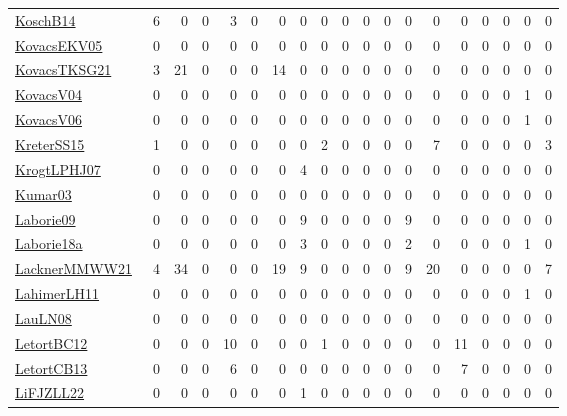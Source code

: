 {\begin{longtable}{l*{18}{r}}
\href{papers/KoschB14.pdf}{KoschB14}~\cite{KoschB14} & 6 & 0 & 0 & 3 & 0 & 0 & 0 & 0 & 0 & 0 & 0 & 0 & 0 & 0 & 0 & 0 & 0 & 0\\
\href{papers/KovacsEKV05.pdf}{KovacsEKV05}~\cite{KovacsEKV05} & 0 & 0 & 0 & 0 & 0 & 0 & 0 & 0 & 0 & 0 & 0 & 0 & 0 & 0 & 0 & 0 & 0 & 0\\
\href{papers/KovacsTKSG21.pdf}{KovacsTKSG21}~\cite{KovacsTKSG21} & 3 & 21 & 0 & 0 & 0 & 14 & 0 & 0 & 0 & 0 & 0 & 0 & 0 & 0 & 0 & 0 & 0 & 0\\
\href{papers/KovacsV04.pdf}{KovacsV04}~\cite{KovacsV04} & 0 & 0 & 0 & 0 & 0 & 0 & 0 & 0 & 0 & 0 & 0 & 0 & 0 & 0 & 0 & 0 & 1 & 0\\
\href{papers/KovacsV06.pdf}{KovacsV06}~\cite{KovacsV06} & 0 & 0 & 0 & 0 & 0 & 0 & 0 & 0 & 0 & 0 & 0 & 0 & 0 & 0 & 0 & 0 & 1 & 0\\
\href{papers/KreterSS15.pdf}{KreterSS15}~\cite{KreterSS15} & 1 & 0 & 0 & 0 & 0 & 0 & 0 & 2 & 0 & 0 & 0 & 0 & 7 & 0 & 0 & 0 & 0 & 3\\
\href{papers/KrogtLPHJ07.pdf}{KrogtLPHJ07}~\cite{KrogtLPHJ07} & 0 & 0 & 0 & 0 & 0 & 0 & 4 & 0 & 0 & 0 & 0 & 0 & 0 & 0 & 0 & 0 & 0 & 0\\
\href{papers/Kumar03.pdf}{Kumar03}~\cite{Kumar03} & 0 & 0 & 0 & 0 & 0 & 0 & 0 & 0 & 0 & 0 & 0 & 0 & 0 & 0 & 0 & 0 & 0 & 0\\
\href{papers/Laborie09.pdf}{Laborie09}~\cite{Laborie09} & 0 & 0 & 0 & 0 & 0 & 0 & 9 & 0 & 0 & 0 & 0 & 9 & 0 & 0 & 0 & 0 & 0 & 0\\
\href{papers/Laborie18a.pdf}{Laborie18a}~\cite{Laborie18a} & 0 & 0 & 0 & 0 & 0 & 0 & 3 & 0 & 0 & 0 & 0 & 2 & 0 & 0 & 0 & 0 & 1 & 0\\
\href{papers/LacknerMMWW21.pdf}{LacknerMMWW21}~\cite{LacknerMMWW21} & 4 & 34 & 0 & 0 & 0 & 19 & 9 & 0 & 0 & 0 & 0 & 9 & 20 & 0 & 0 & 0 & 0 & 7\\
\href{papers/LahimerLH11.pdf}{LahimerLH11}~\cite{LahimerLH11} & 0 & 0 & 0 & 0 & 0 & 0 & 0 & 0 & 0 & 0 & 0 & 0 & 0 & 0 & 0 & 0 & 1 & 0\\
\href{papers/LauLN08.pdf}{LauLN08}~\cite{LauLN08} & 0 & 0 & 0 & 0 & 0 & 0 & 0 & 0 & 0 & 0 & 0 & 0 & 0 & 0 & 0 & 0 & 0 & 0\\
\href{papers/LetortBC12.pdf}{LetortBC12}~\cite{LetortBC12} & 0 & 0 & 0 & 10 & 0 & 0 & 0 & 1 & 0 & 0 & 0 & 0 & 0 & 11 & 0 & 0 & 0 & 0\\
\href{papers/LetortCB13.pdf}{LetortCB13}~\cite{LetortCB13} & 0 & 0 & 0 & 6 & 0 & 0 & 0 & 0 & 0 & 0 & 0 & 0 & 0 & 7 & 0 & 0 & 0 & 0\\
\href{papers/LiFJZLL22.pdf}{LiFJZLL22}~\cite{LiFJZLL22} & 0 & 0 & 0 & 0 & 0 & 0 & 1 & 0 & 0 & 0 & 0 & 0 & 0 & 0 & 0 & 0 & 0 & 0\\

\end{longtable}}
